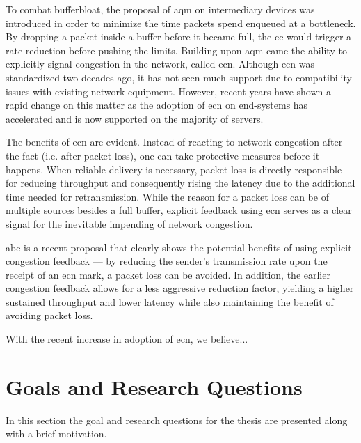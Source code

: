 To combat bufferbloat, the proposal of \gls{aqm} on intermediary devices was introduced in order to minimize the time packets spend enqueued at a bottleneck. By dropping a packet inside a buffer before it became full, the \gls{cc} would trigger a rate reduction before pushing the limits. Building upon \gls{aqm} came the ability to explicitly signal congestion in the network, called \gls{ecn}. Although \gls{ecn} was standardized two decades ago, it has not seen much support due to compatibility issues with existing network equipment. However, recent years have shown a rapid change on this matter as the adoption of \gls{ecn} on end-systems has accelerated and is now supported on the majority of servers. \cite{enabling_internet-wide_ecn}

The benefits of \gls{ecn} are evident. Instead of reacting to network congestion after the fact (i.e. after packet loss), one can take protective  measures before it happens. When reliable delivery is necessary, packet loss is directly responsible for reducing throughput and consequently rising the latency due to the additional time needed for retransmission. While the reason for a packet loss can be of multiple sources besides a full buffer, explicit feedback using \gls{ecn} serves as a clear signal for the inevitable impending of network congestion.

\gls{abe} \cite{abe} is a recent proposal  that clearly shows the potential  benefits of using explicit congestion feedback --- by reducing the sender's transmission rate upon the receipt of an \gls{ecn} mark, a packet loss can be avoided. In addition, the earlier congestion feedback allows for a less aggressive reduction factor, yielding a higher sustained throughput and lower latency while also maintaining the benefit of avoiding packet loss.

With the recent increase in adoption of \gls{ecn}, we believe... 









\section{Goals and Research Questions} \label{goals_and_research_questions}

In this section the goal and research questions for the thesis are presented along with a brief motivation.

